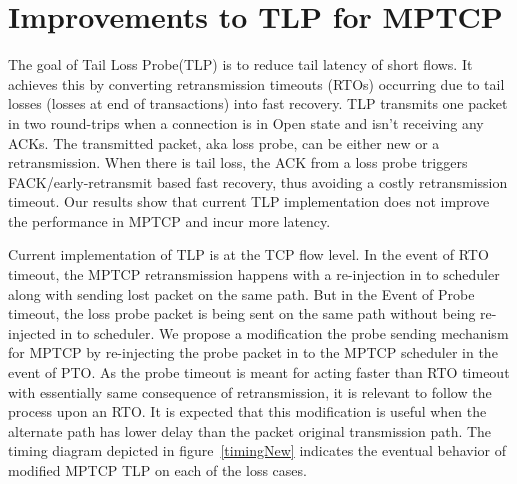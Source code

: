 \documentclass[10pt,draftcls,twocolumn]{IEEEconf}
\begin{document}


\section{Improvements to TLP for MPTCP}\label{impr}
The goal of Tail Loss Probe(TLP) is to reduce tail latency of short flows. It achieves this by converting retransmission timeouts (RTOs) occurring due to tail losses (losses at end of transactions) into fast recovery. TLP transmits one packet in two round-trips when a connection is in Open state and isn't receiving any ACKs. The transmitted packet, aka loss probe, can be either new or a retransmission. When there is tail loss, the ACK from a loss probe triggers FACK/early-retransmit based fast recovery, thus avoiding a costly retransmission timeout. Our results show that current TLP implementation does not improve the performance in MPTCP and incur more latency.

Current implementation of TLP is at the TCP flow level. In the event of RTO timeout, the MPTCP retransmission happens with a re-injection in to scheduler along with sending lost packet on the same path. But in the Event of Probe timeout, the loss probe packet is being sent on the same path without being re-injected in to scheduler. We propose a modification the probe sending mechanism for MPTCP by re-injecting the probe packet in to the MPTCP scheduler in the event of PTO. As the probe timeout is meant for acting faster than RTO timeout with essentially same consequence of retransmission, it is relevant to follow the process upon an RTO. It is expected that this modification is useful when the alternate path has lower delay than the packet original transmission path. The timing diagram depicted in figure~\ref{timingNew} indicates the eventual behavior of modified MPTCP TLP on each of the loss cases. 
\end{document}
